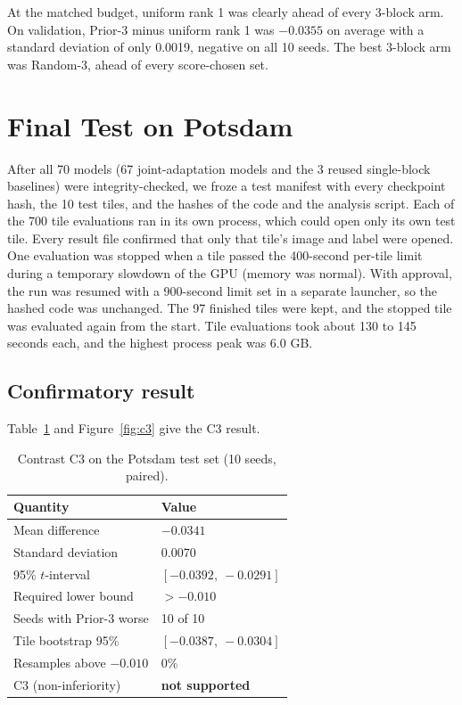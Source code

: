 \documentclass[11pt,a4paper]{report}
\begin{document}
At the matched budget, uniform rank 1 was clearly ahead of every 3-block arm. On validation, Prior-3 minus uniform rank 1 was $-0.0355$ on average with a standard deviation of only 0.0019, negative on all 10 seeds. The best 3-block arm was Random-3, ahead of every score-chosen set.

\section{Final Test on Potsdam}

After all 70 models (67 joint-adaptation models and the 3 reused single-block baselines) were integrity-checked, we froze a test manifest with every checkpoint hash, the 10 test tiles, and the hashes of the code and the analysis script. Each of the 700 tile evaluations ran in its own process, which could open only its own test tile. Every result file confirmed that only that tile's image and label were opened. One evaluation was stopped when a tile passed the 400-second per-tile limit during a temporary slowdown of the GPU (memory was normal). With approval, the run was resumed with a 900-second limit set in a separate launcher, so the hashed code was unchanged. The 97 finished tiles were kept, and the stopped tile was evaluated again from the start. Tile evaluations took about 130 to 145 seconds each, and the highest process peak was 6.0 GB.

\subsection{Confirmatory result}

Table~\ref{tab:c3} and Figure~\ref{fig:c3} give the C3 result.

\begin{table}[t]
\centering
\caption{Contrast C3 on the Potsdam test set (10 seeds, paired).}
\label{tab:c3}
\small
\begin{tabular}{@{}ll@{}}
\toprule
\textbf{Quantity} & \textbf{Value} \\
\midrule
Mean difference & $-0.0341$ \\
Standard deviation & 0.0070 \\
95\% $t$-interval & $[-0.0392,\ -0.0291]$ \\
Required lower bound & $> -0.010$ \\
Seeds with Prior-3 worse & 10 of 10 \\
Tile bootstrap 95\% & $[-0.0387,\ -0.0304]$ \\
Resamples above $-0.010$ & 0\% \\
\midrule
C3 (non-inferiority) & \textbf{not supported} \\
\bottomrule
\end{tabular}
\end{table}
\end{document}
